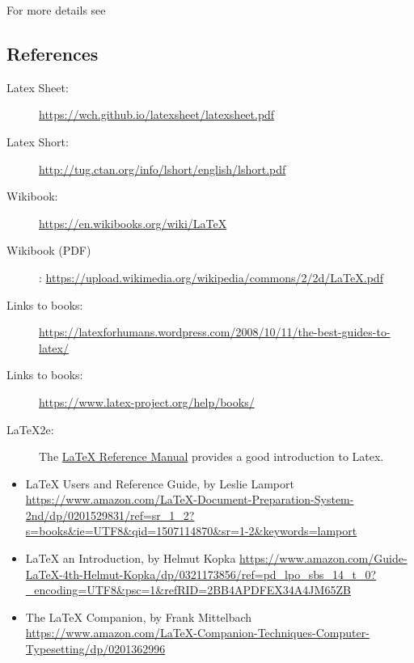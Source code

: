 For more details see


\subsection{References}

\begin{description}


\item[Latex Sheet:]    \url{https://wch.github.io/latexsheet/latexsheet.pdf}

\item[Latex Short:]    \url{http://tug.ctan.org/info/lshort/english/lshort.pdf}

\item[Wikibook:]       \url{https://en.wikibooks.org/wiki/LaTeX}
\item[Wikibook (PDF)]: \url{https://upload.wikimedia.org/wikipedia/commons/2/2d/LaTeX.pdf}

\item [Links to books:] \url{https://latexforhumans.wordpress.com/2008/10/11/the-best-guides-to-latex/}
\item [Links to books:] \url{https://www.latex-project.org/help/books/}
\item [LaTeX2e:]
  The
  \href{http://texdoc.net/texmf-dist/doc/latex/latex2e-help-texinfo/latex2e.pdf}{LaTeX
  Reference Manual} provides a good introduction to Latex.

\end{description}


\begin{itemize}

\item
  LaTeX Users and Reference Guide, by Leslie Lamport
  \url{https://www.amazon.com/LaTeX-Document-Preparation-System-2nd/dp/0201529831/ref=sr_1_2?s=books\&ie=UTF8\&qid=1507114870\&sr=1-2\&keywords=lamport}
\item
  LaTeX an Introduction, by Helmut Kopka
  \url{https://www.amazon.com/Guide-LaTeX-4th-Helmut-Kopka/dp/0321173856/ref=pd_lpo_sbs_14_t_0?_encoding=UTF8\&psc=1\&refRID=2BB4APDFEX34A4JM65ZB}
\item
  The LaTeX Companion, by Frank Mittelbach
  \url{https://www.amazon.com/LaTeX-Companion-Techniques-Computer-Typesetting/dp/0201362996}
\end{itemize}

